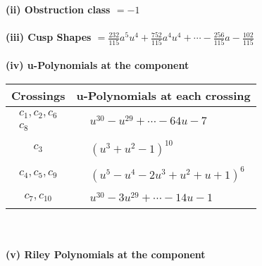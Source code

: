 \documentclass[1p]{elsarticle_modified}
\theoremstyle{definition}
\begin{document}
\flushleft \textbf{(ii) Obstruction class $= -1$}\\~\\
\flushleft \textbf{(iii) Cusp Shapes $= \frac{232}{115} a^5 u^4+\frac{752}{115} a^4 u^4+\cdots-\frac{256}{115} a-\frac{102}{115}$}\\~\\
\newpage\renewcommand{\arraystretch}{1}
\flushleft \textbf{(iv) u-Polynomials at the component}\newline \\
\begin{tabular}{m{50pt}|m{274pt}}
Crossings & \hspace{64pt}u-Polynomials at each crossing \\
\hline $$\begin{aligned}c_{1},c_{2},c_{6}\\c_{8}\end{aligned}$$&$\begin{aligned}
&u^{30}- u^{29}+\cdots-64 u-7
\end{aligned}$\\
\hline $$\begin{aligned}c_{3}\end{aligned}$$&$\begin{aligned}
&(u^3+u^2-1)^{10}
\end{aligned}$\\
\hline $$\begin{aligned}c_{4},c_{5},c_{9}\end{aligned}$$&$\begin{aligned}
&(u^5- u^4-2 u^3+u^2+u+1)^6
\end{aligned}$\\
\hline $$\begin{aligned}c_{7},c_{10}\end{aligned}$$&$\begin{aligned}
&u^{30}-3 u^{29}+\cdots-14 u-1
\end{aligned}$\\
\hline
\end{tabular}\\~\\
\newpage\renewcommand{\arraystretch}{1}
\flushleft \textbf{(v) Riley Polynomials at the component}\newline \\
\end{document}

